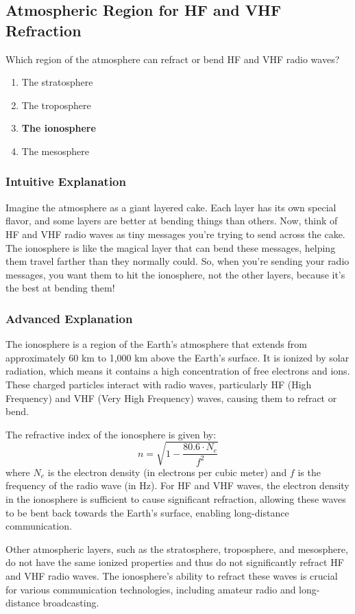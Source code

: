 \subsection{Atmospheric Region for HF and VHF Refraction}
\label{T3A11}

\begin{tcolorbox}[colback=gray!10!white,colframe=black!75!black,title=T3A11]
Which region of the atmosphere can refract or bend HF and VHF radio waves?
\begin{enumerate}[label=\Alph*)]
    \item The stratosphere
    \item The troposphere
    \item \textbf{The ionosphere}
    \item The mesosphere
\end{enumerate}
\end{tcolorbox}

\subsubsection{Intuitive Explanation}
Imagine the atmosphere as a giant layered cake. Each layer has its own special flavor, and some layers are better at bending things than others. Now, think of HF and VHF radio waves as tiny messages you're trying to send across the cake. The ionosphere is like the magical layer that can bend these messages, helping them travel farther than they normally could. So, when you're sending your radio messages, you want them to hit the ionosphere, not the other layers, because it's the best at bending them!

\subsubsection{Advanced Explanation}
The ionosphere is a region of the Earth's atmosphere that extends from approximately 60 km to 1,000 km above the Earth's surface. It is ionized by solar radiation, which means it contains a high concentration of free electrons and ions. These charged particles interact with radio waves, particularly HF (High Frequency) and VHF (Very High Frequency) waves, causing them to refract or bend.

The refractive index of the ionosphere is given by:
\[
n = \sqrt{1 - \frac{80.6 \cdot N_e}{f^2}}
\]
where \( N_e \) is the electron density (in electrons per cubic meter) and \( f \) is the frequency of the radio wave (in Hz). For HF and VHF waves, the electron density in the ionosphere is sufficient to cause significant refraction, allowing these waves to be bent back towards the Earth's surface, enabling long-distance communication.

Other atmospheric layers, such as the stratosphere, troposphere, and mesosphere, do not have the same ionized properties and thus do not significantly refract HF and VHF radio waves. The ionosphere's ability to refract these waves is crucial for various communication technologies, including amateur radio and long-distance broadcasting.

